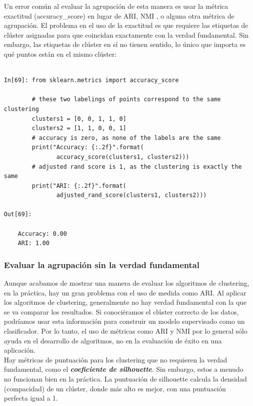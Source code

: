 Un error común al evaluar la agrupación de esta manera es usar la métrica exactitud  ({\ttfamily accuracy\_score}) en lugar de ARI, NMI , o alguna otra métrica de agrupación.  El problema en el uso de la exactitud  es que requiere las etiquetas de clúster asignadas para que coincidan exactamente con la verdad fundamental. Sin embargo, las etiquetas de clúster en sí no tienen sentido, lo único que importa es qué puntos están en el mismo clúster:


\begin{lstlisting}  
	
In[69]: from sklearn.metrics import accuracy_score
   
        # these two labelings of points correspond to the same clustering
        clusters1 = [0, 0, 1, 1, 0]
        clusters2 = [1, 1, 0, 0, 1]
        # accuracy is zero, as none of the labels are the same
        print("Accuracy: {:.2f}".format(
               accuracy_score(clusters1, clusters2)))
        # adjusted rand score is 1, as the clustering is exactly the same
        print("ARI: {:.2f}".format(
               adjusted_rand_score(clusters1, clusters2)))

Out[69]:

    Accuracy: 0.00
    ARI: 1.00

\end{lstlisting} 


\subsubsection{Evaluar la agrupación sin la verdad fundamental} 

Aunque acabamos de mostrar una manera de evaluar los algoritmos de  clustering, en la práctica, hay un gran problema con el uso de medida como ARI. Al aplicar los algoritmos de  clustering, generalmente no hay verdad fundamental con la que se va comparar los resultados.   Si conociéramos el clúster correcto de los datos, podríamos usar esta información para construir un modelo supervisado como un clasificador. Por lo tanto, el uso de métricas como ARI y NMI por lo general sólo ayuda en el desarrollo de algoritmos, no en la evaluación de éxito en una aplicación. \\


Hay métricas de puntuación para los clustering que no requieren la verdad fundamental, como el \emph{\bf{coeficiente de silhouette}}. Sin embargo, estos a menudo no funcionan bien en la práctica. La puntuación de silhouette calcula la densidad (compacidad) de un clúster, donde más alto es mejor, con una puntuación perfecta igual a  1.

